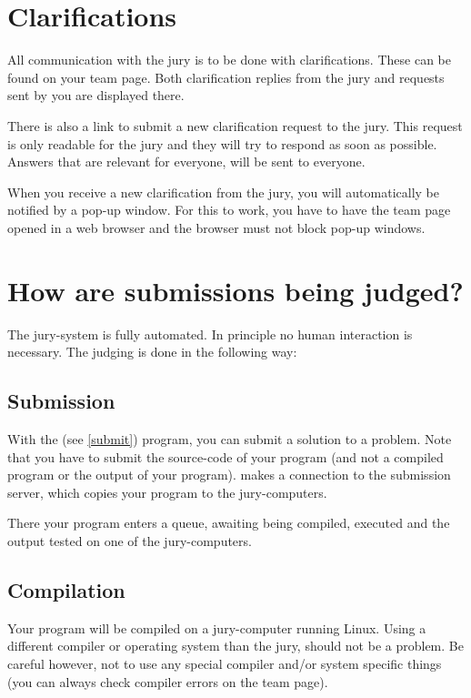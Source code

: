 \section{Clarifications}

All communication with the jury is to be done with clarifications.
These can be found on your team page. Both clarification replies from
the jury and requests sent by you are displayed  there.

There is also a link to submit a new clarification request to the
jury. This request is only readable for the jury and they will
try to respond as soon as possible. Answers that are relevant for
everyone, will be sent to everyone.

When you receive a new clarification from the jury, you will
automatically be notified by a pop-up window. For this to work, you
have to have the team page opened in a web browser and the browser must
not block pop-up windows.

\section{How are submissions being judged?}

The \DOMjudge jury-system is fully automated. In principle no human
interaction is necessary. The judging is done in the following way:

\subsection{Submission}

With the  (see \ref{submit}) program, you can submit a
solution to a problem. Note that you have to submit the source-code of
your program (and not a compiled program or the output of your
program).  makes a connection to the submission server,
which copies your program to the jury-computers.

There your program enters a queue, awaiting being compiled, executed
and the output tested on one of the jury-computers.

\subsection{Compilation}

Your program will be compiled on a jury-computer running Linux.
Using a different compiler or operating system than the jury, should
not be a problem. Be careful however, not to use any special compiler
and/or system specific things (you can always check compiler errors on
the team page).

